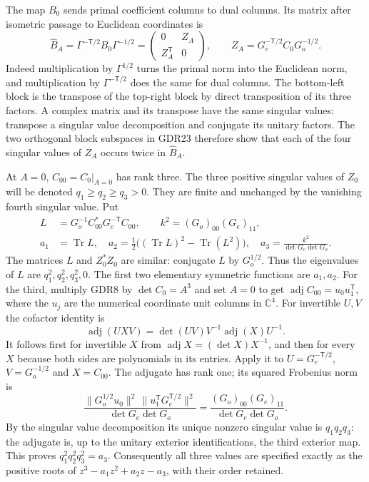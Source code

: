 \documentclass[10pt]{article}
\newcommand{\C}{\mathbb C}
\newcommand{\Tr}{\operatorname{Tr}}
\begin{document}
The map $B_0$ sends primal coefficient columns to dual columns.
Its matrix after isometric passage to Euclidean coordinates is
\begin{equation}
 \widehat B_A=\Gamma^{-\mathsf T/2}B_0\Gamma^{-1/2}
  =\begin{pmatrix}0&Z_A\\Z_A^{\mathsf T}&0\end{pmatrix},
 \qquad Z_A=G_e^{-\mathsf T/2}C_0G_o^{-1/2}.
 \tag{GDR23}
\end{equation}
Indeed multiplication by $\Gamma^{1/2}$ turns the primal norm
into the Euclidean norm, and multiplication by
$\Gamma^{-\mathsf T/2}$ does the same for dual columns.
The bottom-left block is the transpose of the top-right block
by direct transposition of its three factors. A complex matrix
and its transpose have the same singular values: transpose a
singular value decomposition and conjugate its unitary factors.
The two orthogonal block subspaces in GDR23 therefore show
that each of the four singular values of $Z_A$ occurs twice
in $\widehat B_A$.

At $A=0$, $C_{00}=C_0|_{A=0}$ has rank three. The three
positive singular values of $Z_0$ will be denoted
$q_1\ge q_2\ge q_3>0$. They are finite and unchanged by
the vanishing fourth singular value. Put
\begin{equation}
 \begin{aligned}
 L&=G_o^{-1}C_{00}^*G_e^{-\mathsf T}C_{00},\qquad
 k^2=(G_o)_{00}(G_e)_{11},\\
 a_1&=\Tr L,\quad
 a_2=\tfrac12\big((\Tr L)^2-\Tr(L^2)\big),\quad
 a_3=\frac{k^2}{\det G_e\det G_o}.
 \end{aligned}
 \tag{GDR24}
\end{equation}
The matrices $L$ and $Z_0^*Z_0$ are similar: conjugate $L$
by $G_o^{1/2}$. Thus the eigenvalues of $L$ are
$q_1^2,q_2^2,q_3^2,0$. The first two elementary symmetric
functions are $a_1,a_2$. For the third, multiply GDR8 by
$\det C_0=A^3$ and set $A=0$ to get
$\operatorname{adj}C_{00}=u_0u_1^{\mathsf T}$, where the
$u_j$ are the numerical coordinate unit columns in $\C^4$.
For invertible $U,V$ the cofactor identity is
\[
 \operatorname{adj}(UXV)=\det(UV)V^{-1}
          \operatorname{adj}(X)U^{-1}.
\]
It follows first for invertible $X$ from
$\operatorname{adj}X=(\det X)X^{-1}$, and then for every
$X$ because both sides are polynomials in its entries.
Apply it to $U=G_e^{-\mathsf T/2}$, $V=G_o^{-1/2}$
and $X=C_{00}$. The adjugate has rank one; its squared
Frobenius norm is
\[
 \frac{\|G_o^{1/2}u_0\|^2\,
        \|u_1^{\mathsf T}G_e^{\mathsf T/2}\|^2}
      {\det G_e\det G_o}
 =\frac{(G_o)_{00}(G_e)_{11}}{\det G_e\det G_o}.
\]
By the singular value decomposition its unique nonzero
singular value is $q_1q_2q_3$: the adjugate is, up to the
unitary exterior identifications, the third exterior map.
This proves $q_1^2q_2^2q_3^2=a_3$. Consequently all three
values are specified exactly as the positive roots of
$z^3-a_1z^2+a_2z-a_3$, with their order retained.
\end{document}
